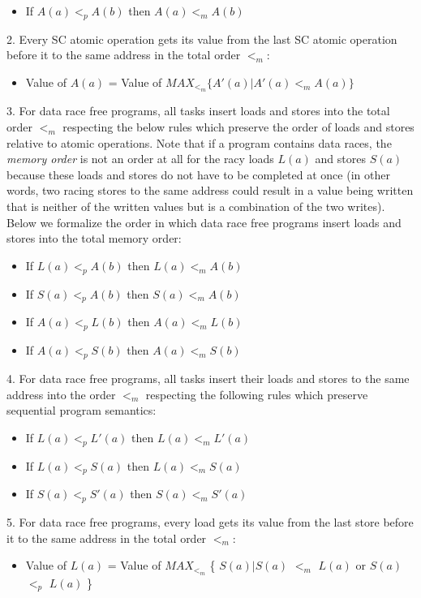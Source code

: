 \begin{itemize}
  \item If $A(a)<_pA(b)$ then $A(a)<_mA(b)$
\end{itemize}

2. Every SC atomic operation gets its value from the last SC atomic operation before it to the same address in the total order $<_m$:
\begin{itemize}
  \item Value of $A(a)$ = Value of $MAX_{<_m} \{A'(a)|A'(a) <_m A(a) \}$
\end{itemize}

3. For data race free programs, all tasks insert loads and stores into the
total order $<_m$ respecting the below rules which preserve the order of loads
and stores relative to atomic operations.  Note that if a program contains data
races, the \textit{memory order} is not an order at all for the racy loads
$L(a)$ and stores $S(a)$ because these loads and stores do not have to be
completed at once (in other words, two racing stores to the same address could
result in a value being written that is neither of the written values but is a
combination of the two writes). Below we formalize the order in which data race free programs insert loads and stores into the total memory order:
\begin{itemize}
  \item If $L(a)<_pA(b)$ then $L(a)<_mA(b)$
  \item If $S(a)<_pA(b)$ then $S(a)<_mA(b)$
  \item If $A(a)<_pL(b)$ then $A(a)<_mL(b)$
  \item If $A(a)<_pS(b)$ then $A(a)<_mS(b)$
\end{itemize}

4. For data race free programs, all tasks insert their loads and stores to the
same address into the order $<_m$ respecting the following rules which preserve
sequential program semantics:

\begin{itemize}
  \item If $L(a) <_p L'(a)$ then $L(a) <_m L'(a)$
  \item If $L(a) <_p S(a)$ then $L(a) <_m S(a)$
  \item If $S(a) <_p S'(a)$ then $S(a) <_m S'(a)$
\end{itemize}

5. For data race free programs, every load gets its value from the last store before it to the same address in the total order $<_m$:
\begin{itemize}
  \item Value of $L(a)$ = Value of $MAX_{<_m}$ \{ $S(a)|S(a)$ $<_m$ $L(a)$ or $S(a)$ $<_p$ $L(a)$ \}
\end{itemize}

